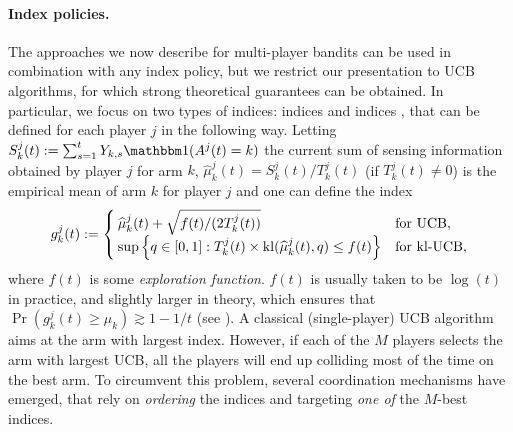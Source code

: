 
\paragraph{Index policies.}
%
The approaches we now describe for multi-player bandits can be used in combination with any index policy, but we restrict our presentation to UCB algorithms, for which strong theoretical guarantees can be obtained. In particular, we focus on two types of indices:
\UCB{} indices \citep{Auer02}
and \klUCB{} indices \citep{KLUCBJournal}, that can be defined for each player $j$ in the following way.
%
Letting $S_k^j(t) := \sum_{s=1}^t Y_{k,s} \indic(A^j(t) = k)$ the current sum of sensing information obtained by player $j$ for arm $k$, $\widehat{\mu}_k^j(t) = S_k^j(t)/T_k^j(t)$ (if $T_k^j(t)\neq 0$) is the empirical mean of arm $k$ for player $j$ and one can define the index
\begin{equation}\label{eq:5:indexFor_UCB_klUCB}
  g_k^j(t) := \begin{cases}
      \widehat{\mu}_k^j(t)  + \sqrt{  f(t) / (2T_k^j(t))}
      &\text{for } \mathrm{UCB}, \\
      \sup\left\{ q \in [0, 1]: T_k^j(t)\times \mathrm{kl}(\widehat{\mu}_k^j(t), q) \leq f(t) \right\}
      &\text{for } \mathrm{kl}\text{-}\mathrm{UCB},
  \end{cases}
\end{equation}
where $f(t)$ is some \emph{exploration function}. $f(t)$ is usually taken to be $\log(t)$ in practice, and slightly larger in theory, which ensures that  $\Pr(g_k^j(t) \geq \mu_k) \gtrsim 1 - 1/t$ (see \cite{KLUCBJournal}).
A classical (single-player) UCB algorithm aims at the arm with largest index. However, if each of the $M$ players selects the arm with largest UCB, all the players will end up colliding most of the time on the best arm.
To circumvent this problem, several coordination mechanisms have emerged, that rely on \emph{ordering} the indices and targeting \emph{one of} the $M$-best indices.


